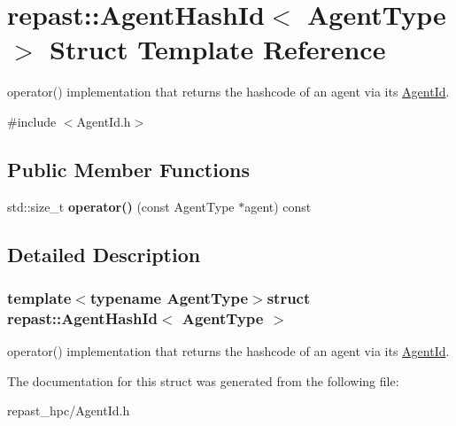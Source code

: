 \hypertarget{structrepast_1_1_agent_hash_id}{\section{repast\-:\-:Agent\-Hash\-Id$<$ Agent\-Type $>$ Struct Template Reference}
\label{structrepast_1_1_agent_hash_id}
}


operator() implementation that returns the hashcode of an agent via its \hyperlink{classrepast_1_1_agent_id}{Agent\-Id}.  




{\ttfamily \#include $<$Agent\-Id.\-h$>$}

\subsection*{Public Member Functions}
\begin{DoxyCompactItemize}
\item 
\hypertarget{structrepast_1_1_agent_hash_id_afff516755fcf498463f6e7817309851b}{std\-::size\-\_\-t {\bfseries operator()} (const Agent\-Type $\ast$agent) const }\label{structrepast_1_1_agent_hash_id_afff516755fcf498463f6e7817309851b}

\end{DoxyCompactItemize}


\subsection{Detailed Description}
\subsubsection*{template$<$typename Agent\-Type$>$struct repast\-::\-Agent\-Hash\-Id$<$ Agent\-Type $>$}

operator() implementation that returns the hashcode of an agent via its \hyperlink{classrepast_1_1_agent_id}{Agent\-Id}. 

The documentation for this struct was generated from the following file\-:\begin{DoxyCompactItemize}
\item 
repast\-\_\-hpc/Agent\-Id.\-h\end{DoxyCompactItemize}
